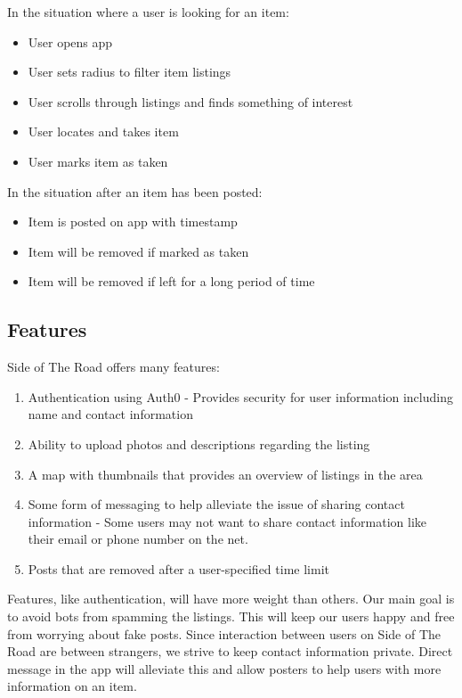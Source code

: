 \documentclass[sigconf]{acmart}
\begin{document}
In the situation where a user is looking for an item: 
\begin{itemize}
	\item User opens app
	\item User sets radius to filter item listings
	\item User scrolls through listings and finds something of interest
	\item User locates and takes item
	\item User marks item as taken 
\end{itemize} 

In the situation after an item has been posted:
\begin{itemize}
	\item Item is posted on app with timestamp
	\item Item will be removed if marked as taken
	\item Item will be removed if left for a long period of time
\end{itemize}

\subsection{Features}
Side of The Road offers many features:
\begin{enumerate}
	\item Authentication using Auth0 - Provides security for user information including name and 
	contact information
	\item Ability to upload photos and descriptions regarding the listing
	\item A map with thumbnails that provides an overview of listings in the area
	\item Some form of messaging to help alleviate the issue of sharing contact information - Some 	users may not want to share contact information like their email or phone number on the net.
	\item Posts that are removed after a user-specified time limit
\end{enumerate}

\noindent
Features, like authentication, will have more weight than others. Our main goal is to avoid bots from spamming the listings. This will keep our users happy and free from worrying about fake posts. Since interaction between users on Side of The Road are between strangers, we strive to keep contact information private. Direct message in the app will alleviate this and allow posters to help users with more information on an item. \\
\end{document}
